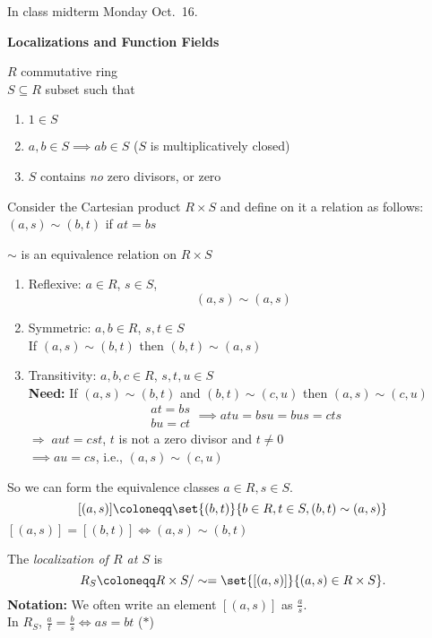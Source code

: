 In class midterm Monday Oct.\ 16.

\textbf{Localizations and Function Fields}

$R$ commutative ring \\
$S\subseteq R$ subset such that
\begin{enumerate}
\item $1\in S$
\item $a,b\in S\implies ab\in S$ ($S$ is multiplicatively closed)
\item $S$ contains \emph{no} zero divisors, or zero
\end{enumerate}
Consider the Cartesian product $R\times S$ and define on it a relation as follows: \\
 $(a,s)\sim(b,t)$ if $at=bs$

\lem $\sim$ is an equivalence relation on $R\times S$ \\
\pf
\begin{enumerate}
\item Reflexive: $a\in R$, $s\in S$,
\[ (a,s)\sim(a,s) \]
\item Symmetric: $a,b\in R$, $s,t\in S$ \\
If $(a,s)\sim(b,t)$ then $(b,t)\sim(a,s)$
\item Transitivity: $a,b,c\in R$, $s,t,u\in S$ \\
\textbf{Need:} If $(a,s)\sim(b,t)$ and $(b,t)\sim(c,u)$ then $(a,s)\sim(c,u)$ \\
\[ \begin{gathered}
at = bs \\
bu = ct
\end{gathered}
\implies atu = bsu = bus = cts \]
$\Longrightarrow\; aut=cst$, $t$ is not a zero divisor and $t\neq0$ \\
$\implies au = cs$, i.e., $(a,s)\sim(c,u)$
\end{enumerate}
So we can form the equivalence classes $a\in R, s\in S$.
\[ [(a,s)] \coloneqq \set{(b,t)}{b\in R, t\in S, (b,t)\sim(a,s)} \]
\note $[(a,s)]=[(b,t)]\iff(a,s)\sim(b,t)$

 The \emph{localization of $R$ at $S$} is
\[ R_S \coloneqq R\times S/\sim = \set{[(a,s)]}{(a,s)\in R\times S} . \]
\textbf{Notation:} We often write an element $[(a,s)]$ as $\frac{a}{s}$. \\
\note In $R_S$, $\frac{a}{t}=\frac{b}{s} \iff as=bt$ ($*$)

